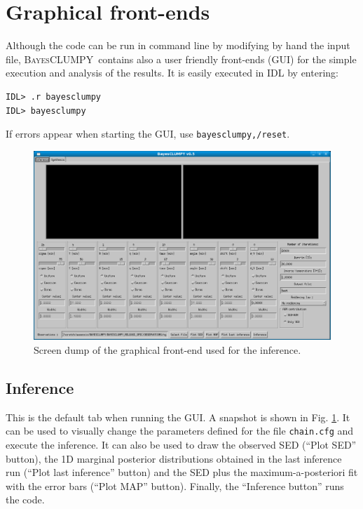\documentclass[12pt]{article}
\def\B{\textsc{BayesCLUMPY}}
\begin{document}
\section{Graphical front-ends}
Although the code can be run in command line by modifying by hand the input file, 
\B\ contains also a user friendly front-ends (GUI) for the simple execution and
analysis of the results. It is easily executed in IDL by entering:
\begin{verbatim}
IDL> .r bayesclumpy
IDL> bayesclumpy
\end{verbatim}
If errors appear when starting the GUI, use \texttt{bayesclumpy,/reset}.

\begin{figure}[!t]
\includegraphics[scale=0.5]{snapshot1.png}
\caption{Screen dump of the graphical front-end used for the inference.
\label{fig:inversion_GUI}}
\end{figure}

\subsection{Inference}
This is the default tab when running the GUI. A snapshot is shown in Fig. \ref{fig:inversion_GUI}.
It can be used to visually change the
parameters defined for the file \texttt{chain.cfg} and execute the inference. It can
also be used to draw the observed SED (``Plot SED'' button), the 1D marginal posterior
distributions obtained in the last inference run (``Plot last inference'' button) and the
SED plus the maximum-a-posteriori fit with the error bars (``Plot MAP'' button). Finally,
the ``Inference button'' runs the code.
\end{document}
